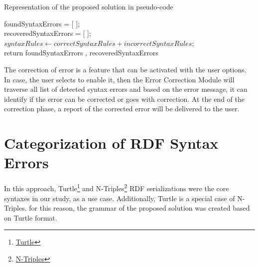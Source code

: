 \begin{algorithm}[H] 
 \caption{Representation of the proposed solution  in pseudo-code}
 \label{alg:algorithm-main}

foundSyntaxErrors = [ ];\\
recoveredSyntaxErrors = [ ];\\
$syntaxRules \leftarrow correctSyntaxRules + incorrectSyntaxRules;$\\
return foundSyntaxErrors , recoveredSyntaxErrors
\end{algorithm}

The correction of error is a feature that can be activated with the user options. In case, the user selects to enable it, then the Error Correction Module will traverse all list of detected syntax errors and based on the error message, it can identify if the error can be corrected or goes with correction. At the end of the correction phase, a report of the corrected error will be delivered to the user. 

\section{Categorization of RDF Syntax Errors}
 In this approach, Turtle\footnote{\href{https://www.w3.org/TR/turtle/}{Turtle}} and N-Triples\footnote{\href{https://www.w3.org/TR/n-triples/}{N-Triples}} RDF serializations were the core syntaxes in our study, as a use case. Additionally, Turtle is a special case of N-Triples. for this reason, the grammar of the proposed solution was created based on Turtle format. 
 
